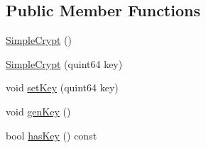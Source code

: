 \subsection*{Public Member Functions}
\begin{DoxyCompactItemize}
\item 
\hyperlink{class_simple_crypt_ac474d12cfa9f93bfecea35891831046d}{Simple\+Crypt} ()
\item 
\hyperlink{class_simple_crypt_a65942757b85b3dd36618ea3edc5ceb89}{Simple\+Crypt} (quint64 key)
\item 
void \hyperlink{class_simple_crypt_aa7aad9ed2e88b883ba9214c7d9928745}{set\+Key} (quint64 key)
\item 
void \hyperlink{class_simple_crypt_a7aa2679a2350622c649e8448545ae8a4}{gen\+Key} ()
\item 
\hypertarget{class_simple_crypt_aa7cab41b041f1fbe1c62e484fea895ce}{}bool \hyperlink{class_simple_crypt_aa7cab41b041f1fbe1c62e484fea895ce}{has\+Key} () const \label{class_simple_crypt_aa7cab41b041f1fbe1c62e484fea895ce}


\end{DoxyCompactItemize}
